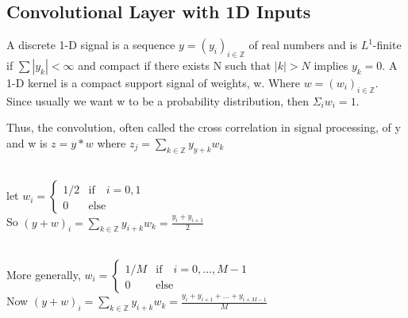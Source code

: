 \subsection{Convolutional Layer with 1D Inputs}
\begin{definition}
    A discrete 1-D signal is a sequence $y=(y_i)_{i\in\mathbb{Z}}$ of real numbers and is $L^1$-finite if $\sum |y_k| < \infty$ and compact if there exists N such that $|k| > N$ implies $y_k=0$.
    A 1-D kernel is a compact support signal of weights, w. Where $w = (w_i)_{i\in\mathbb{Z}}$. Since usually we want w to be a probability distribution, then $\Sigma_{i}w_i = 1$.
\end{definition}
Thus, the convolution, often called the cross correlation in signal processing, of y and w is $z=y*w$ where $z_{j} = \sum_{k\in\mathbb{Z}} y_{y+k}w_{k}$
\begin{example} \quad
\\
let
$w_i = \begin{cases}
    1/2 &\text{if} \quad i=0,1\\
    0 &\text{else}
\end{cases}$
\\
So $(y+w)_i=\sum_{k\in\mathbb{Z}} y_{i+k}w_k=\frac{y_i+y_{i+1}}{2}$
\end{example}
\noindent
\\
More generally,
$w_i = \begin{cases}
    1/M &\text{if} \quad i=0,...,M-1\\
    0 &\text{else}
\end{cases}$
\\
Now $(y+w)_i=\sum_{k\in\mathbb{Z}} y_{i+k}w_k=\frac{y_i+y_{i+1}+...+y_{i+M-1}}{M}$
\\
